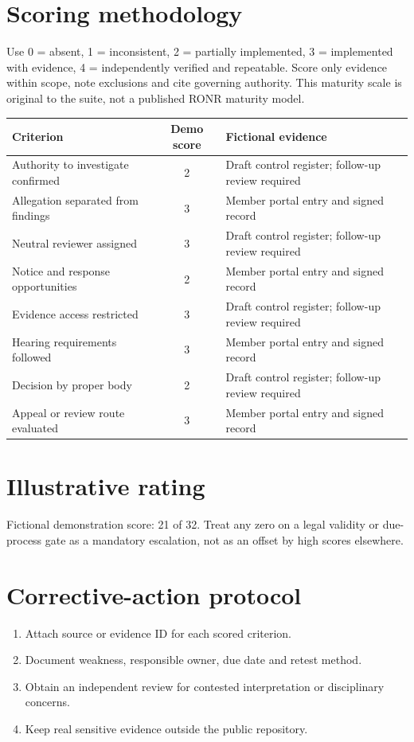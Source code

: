 \documentclass[11pt]{article}
\begin{document}
\SuiteOpen
\section{Scoring methodology}
Use 0 = absent, 1 = inconsistent, 2 = partially implemented, 3 = implemented with evidence, 4 = independently verified and repeatable. Score only evidence within scope, note exclusions and cite governing authority. This maturity scale is original to the suite, not a published RONR maturity model.

\small\begin{longtable}{@{}p{.44\linewidth}cp{.39\linewidth}@{}}\toprule Criterion & Demo score & Fictional evidence\\\midrule\endhead

Authority to investigate confirmed & 2 & Draft control register; follow-up review required\\
Allegation separated from findings & 3 & Member portal entry and signed record\\
Neutral reviewer assigned & 3 & Draft control register; follow-up review required\\
Notice and response opportunities & 2 & Member portal entry and signed record\\
Evidence access restricted & 3 & Draft control register; follow-up review required\\
Hearing requirements followed & 3 & Member portal entry and signed record\\
Decision by proper body & 2 & Draft control register; follow-up review required\\
Appeal or review route evaluated & 3 & Member portal entry and signed record\\
\bottomrule\end{longtable}\normalsize
\section{Illustrative rating}
Fictional demonstration score: 21 of 32. Treat any zero on a legal validity or due-process gate as a mandatory escalation, not as an offset by high scores elsewhere.

\section{Corrective-action protocol}
\begin{enumerate}[leftmargin=*,itemsep=4pt]
\item Attach source or evidence ID for each scored criterion.
\item Document weakness, responsible owner, due date and retest method.
\item Obtain an independent review for contested interpretation or disciplinary concerns.
\item Keep real sensitive evidence outside the public repository.
\end{enumerate}
\end{document}
